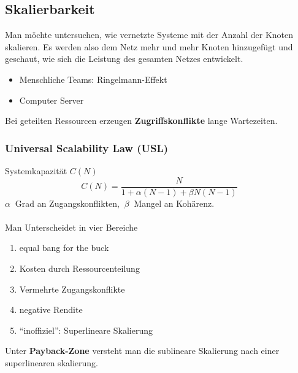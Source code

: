 \documentclass[a4paper]{article}
\begin{document}
\subsection{Skalierbarkeit}
Man möchte untersuchen, wie vernetzte Systeme mit der Anzahl der Knoten skalieren. Es werden also dem Netz mehr und mehr Knoten hinzugefügt und geschaut, wie sich die Leistung des gesamten Netzes entwickelt.
\begin{itemize}
	\item Menschliche Teams: Ringelmann-Effekt
	\item Computer Server
\end{itemize}
Bei geteilten Ressourcen erzeugen \textbf{Zugriffskonflikte} lange Wartezeiten.
\subsubsection{Universal Scalability Law (USL)}
Systemkapazität $C(N)$
$$C(N) = \dfrac{N}{1+\alpha(N-1)+\beta N (N-1)}$$
$\alpha \ $ Grad an Zugangskonflikten, $\ \beta \ $ Mangel an Kohärenz.\\
\\
Man Unterscheidet in vier Bereiche
\begin{enumerate}
	\item equal bang for the buck
	\item Kosten durch Ressourcenteilung
	\item Vermehrte Zugangskonflikte
	\item negative Rendite
	\item ``inoffiziel'': Superlineare Skalierung
\end{enumerate}	
	Unter \textbf{Payback-Zone} versteht man die sublineare Skalierung nach einer superlinearen skalierung.
	
	
	
	
	
	
	
	
	
	
	
	
	
\end{document}
